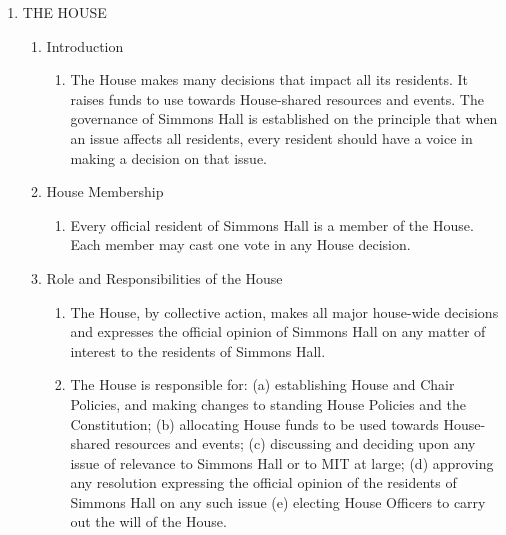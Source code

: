 \documentclass[letterpaper]{article}
\begin{document}
\begin{enumerate}
\begin{enumerate}
\begin{enumerate}
\end{enumerate}

\end{enumerate}

\item THE HOUSE

\begin{enumerate}

\item Introduction

\begin{enumerate}

\item The House makes many decisions that impact all its residents. It raises funds to use towards House-shared resources and events. The governance of Simmons Hall is established on the principle that when an issue affects all residents, every resident should have a voice in making a decision on that issue.

\end{enumerate}

\item House Membership

\begin{enumerate}

\item Every official resident of Simmons Hall is a member of the House. Each member may cast one vote in any House decision.

\end{enumerate}

\item Role and Responsibilities of the House

\begin{enumerate}

\item The House, by collective action, makes all major house-wide decisions and expresses the official opinion of Simmons Hall on any matter of interest to the residents of Simmons Hall.

\item The House is responsible for: (a) establishing House and Chair Policies, and making changes to standing House Policies and the Constitution; (b) allocating House funds to be used towards House-shared resources and events; (c) discussing and deciding upon any issue of relevance to Simmons Hall or to MIT at large; (d) approving any resolution expressing the official opinion of the residents of Simmons Hall on any such issue (e) electing House Officers to carry out the will of the House.


\end{enumerate}
\end{enumerate}
\end{enumerate}
\end{document}
